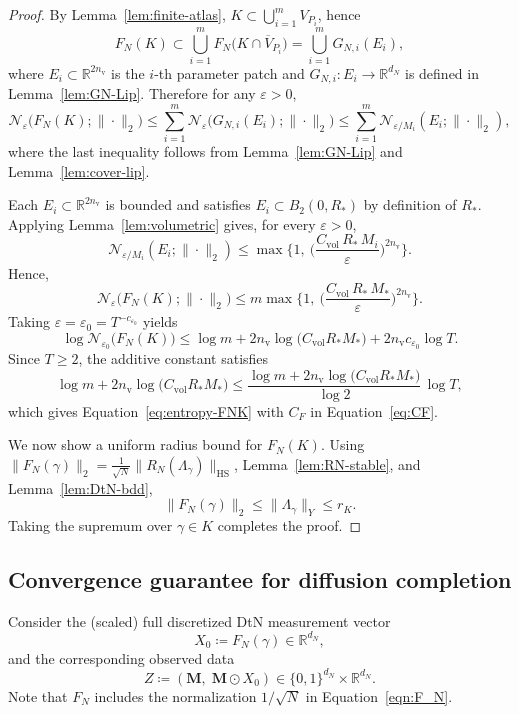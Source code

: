 \documentclass{article}
\def\Eqref#1{Equation~\ref{#1}}
\newcommand{\R}{\mathbb{R}}
\begin{document}
\begin{proof}
By Lemma~\ref{lem:finite-atlas}, $K\subset\bigcup_{i=1}^m V_{P_i}$, hence
\[
F_N(K)\subset \bigcup_{i=1}^m F_N\big(K\cap \overline{V}_{P_i}\big)
= \bigcup_{i=1}^m G_{N,i}(E_i),
\]
where $E_i\subset\R^{2n_{\mathrm v}}$ is the $i$-th parameter patch and $G_{N,i}:E_i\to\R^{d_N}$ is defined
in Lemma~\ref{lem:GN-Lip}.
Therefore for any $\varepsilon>0$,
\begin{equation}\label{eqn:NF_N(K)}
\mathcal{N}_\varepsilon\big(F_N(K);\|\cdot\|_2\big)
\le \sum_{i=1}^m \mathcal{N}_\varepsilon\big(G_{N,i}(E_i);\|\cdot\|_2\big)
\le \sum_{i=1}^m \mathcal{N}_{\varepsilon/M_i}(E_i;\|\cdot\|_2),
\end{equation}
where the last inequality follows from Lemma~\ref{lem:GN-Lip} and Lemma~\ref{lem:cover-lip}.

Each $E_i\subset\R^{2n_{\mathrm v}}$ is bounded and satisfies $E_i\subset B_2(0,R_*)$ by definition of $R_*$.
Applying Lemma~\ref{lem:volumetric} gives, for every $\varepsilon>0$,
\[
\mathcal{N}_{\varepsilon/M_i}(E_i;\|\cdot\|_2)
\le \max\Big\{1,\ \Big(\frac{C_{\mathrm{vol}}\,R_*\,M_i}{\varepsilon}\Big)^{2n_{\mathrm v}}\Big\}.
\]
Hence,
\[
\mathcal{N}_\varepsilon\big(F_N(K);\|\cdot\|_2\big)
\le m\max\Big\{1,\ \Big(\frac{C_{\mathrm{vol}}\,R_*\,M_*}{\varepsilon}\Big)^{2n_{\mathrm v}}\Big\}.
\]
Taking $\varepsilon=\varepsilon_0=T^{-c_{\varepsilon_0}}$ yields
\[
\log \mathcal{N}_{\varepsilon_0}\big(F_N(K)\big)
\le \log m + 2n_{\mathrm v}\log\!\big(C_{\mathrm{vol}}R_*M_*\big) + 2n_{\mathrm v}c_{\varepsilon_0}\log T.
\]
Since $T\ge 2$, the additive constant satisfies
\[
\log m + 2n_{\mathrm v}\log\!\big(C_{\mathrm{vol}}R_*M_*\big)
\le \frac{\log m + 2n_{\mathrm v}\log\!\big(C_{\mathrm{vol}}R_*M_*\big)}{\log 2}\,\log T,
\]
which gives \Eqref{eq:entropy-FNK} with $C_F$ in \Eqref{eq:CF}.

We now show a uniform radius bound for $F_N(K)$.
Using $\|F_N(\gamma)\|_2=\frac{1}{\sqrt{N}}\|R_N(\Lambda_\gamma)\|_{\mathrm{HS}}$,
Lemma~\ref{lem:RN-stable}, and Lemma~\ref{lem:DtN-bdd},
\[
\|F_N(\gamma)\|_2 \le \|\Lambda_\gamma\|_Y \le r_{K}.
\]
Taking the supremum over $\gamma\in K$ completes the proof.
\end{proof}

\subsection{Convergence guarantee for diffusion completion}\label{sec:ddpm_FNK}
Consider the (scaled) full discretized DtN measurement vector
\[
X_0 \coloneqq  F_N(\gamma)\in\R^{d_N},
\]
and the corresponding observed data
\[
Z \coloneqq  (\mathbf{M},\; \mathbf{M}\odot X_0)\in \{0,1\}^{d_N}\times\R^{d_N}.
\]
Note that $F_N$ includes the normalization $1/\sqrt{N}$ in \Eqref{eqn:F_N}.
\end{document}
